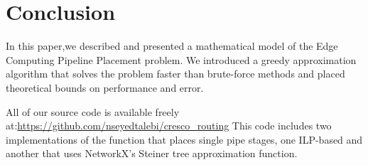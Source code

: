 \documentclass{acmart}
\begin{document}
 	 \section{Conclusion}
 	 In this paper,we described and presented a mathematical model of the Edge Computing Pipeline Placement problem. We introduced a greedy approximation algorithm that solves the problem faster than brute-force methods and placed theoretical bounds on performance and error.

	All of our source code is available freely at:\url{https://github.com/nseyedtalebi/cresco_routing} This code includes two implementations of the function that places single pipe stages, one ILP-based and another that uses NetworkX's Steiner tree approximation function.	
	
	
	
\end{document}
